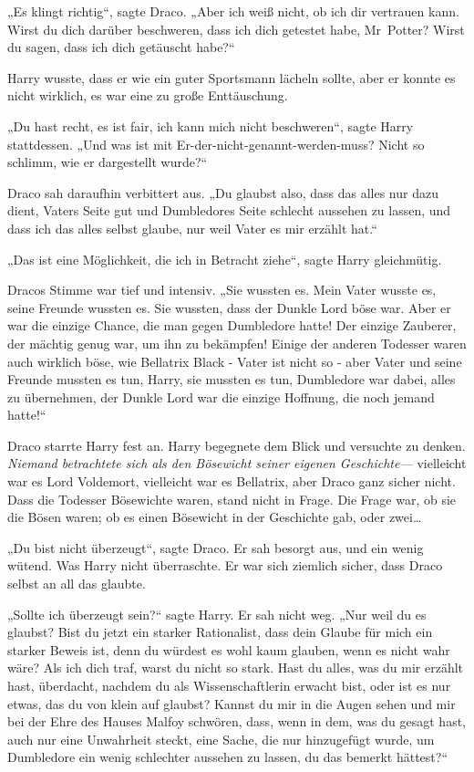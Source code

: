 {„Es klingt richtig“, sagte Draco. „Aber ich weiß nicht, ob ich dir vertrauen kann. Wirst du dich darüber beschweren, dass ich dich getestet habe, Mr~Potter? Wirst du sagen, dass ich dich getäuscht habe?“

Harry wusste, dass er wie ein guter Sportsmann lächeln sollte, aber er konnte es nicht wirklich, es war eine zu große Enttäuschung.

„Du hast recht, es ist fair, ich kann mich nicht beschweren“, sagte Harry stattdessen. „Und was ist mit Er-der-nicht-genannt-werden-muss? Nicht so schlimm, wie er dargestellt wurde?“

Draco sah daraufhin verbittert aus. „Du glaubst also, dass das alles nur dazu dient, Vaters Seite gut und Dumbledores Seite schlecht aussehen zu lassen, und dass ich das alles selbst glaube, nur weil Vater es mir erzählt hat.“

„Das ist eine Möglichkeit, die ich in Betracht ziehe“, sagte Harry gleichmütig.

Dracos Stimme war tief und intensiv. „Sie wussten es. Mein Vater wusste es, seine Freunde wussten es. Sie wussten, dass der Dunkle Lord böse war. Aber er war die einzige Chance, die man gegen Dumbledore hatte! Der einzige Zauberer, der mächtig genug war, um ihn zu bekämpfen! Einige der anderen Todesser waren auch wirklich böse, wie Bellatrix Black - Vater ist nicht so - aber Vater und seine Freunde mussten es tun, Harry, sie mussten es tun, Dumbledore war dabei, alles zu übernehmen, der Dunkle Lord war die einzige Hoffnung, die noch jemand hatte!“

Draco starrte Harry fest an. Harry begegnete dem Blick und versuchte zu denken. \emph{Niemand betrachtete sich als den Bösewicht seiner eigenen Geschichte—} vielleicht war es Lord Voldemort, vielleicht war es Bellatrix, aber Draco ganz sicher nicht. Dass die Todesser Bösewichte waren, stand nicht in Frage. Die Frage war, ob sie die Bösen waren; ob es einen Bösewicht in der Geschichte gab, oder zwei…

„Du bist nicht überzeugt“, sagte Draco. Er sah besorgt aus, und ein wenig wütend. Was Harry nicht überraschte. Er war sich ziemlich sicher, dass Draco selbst an all das glaubte.

„Sollte ich überzeugt sein?“ sagte Harry. Er sah nicht weg. „Nur weil du es glaubst? Bist du jetzt ein starker Rationalist, dass dein Glaube für mich ein starker Beweis ist, denn du würdest es wohl kaum glauben, wenn es nicht wahr wäre? Als ich dich traf, warst du nicht so stark. Hast du alles, was du mir erzählt hast, überdacht, nachdem du als Wissenschaftlerin erwacht bist, oder ist es nur etwas, das du von klein auf glaubst? Kannst du mir in die Augen sehen und mir bei der Ehre des Hauses Malfoy schwören, dass, wenn in dem, was du gesagt hast, auch nur eine Unwahrheit steckt, eine Sache, die nur hinzugefügt wurde, um Dumbledore ein wenig schlechter aussehen zu lassen, du das bemerkt hättest?“

}
